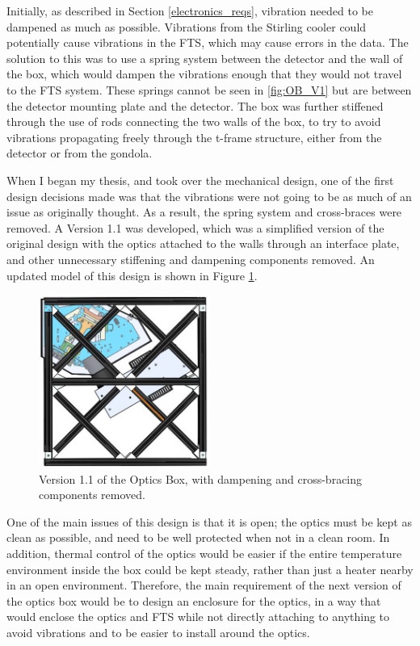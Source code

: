 Initially, as described in Section \ref{electronics_reqs}, vibration needed to be dampened as much as possible. Vibrations from the Stirling cooler could potentially cause vibrations in the FTS, which may cause errors in the data. The solution to this was to use a spring system between the detector and the wall of the box, which would dampen the vibrations enough that they would not travel to the FTS system. These springs cannot be seen in \ref{fig:OB_V1} but are between the detector mounting plate and the detector. The box was further stiffened through the use of rods connecting the two walls of the box, to try to avoid vibrations propagating freely through the t-frame structure, either from the detector or from the gondola.

When I began my thesis, and took over the mechanical design, one of the first design decisions made was that the vibrations were not going to be as much of an issue as originally thought. As a result, the spring system and cross-braces were removed. A Version 1.1 was developed, which was a simplified version of the original design with the optics attached to the walls through an interface plate, and other unnecessary stiffening and dampening components removed. An updated model of this design is shown in Figure \ref{fig:OB_V1.1}.

\begin{figure}
    \centering
    \includegraphics[width=0.5\textwidth]{chap3_images/LIFE_V1_images/Optics_Box_V0_5_front_view.JPG}
    \caption{Version 1.1 of the Optics Box, with dampening and cross-bracing components removed.}
    \label{fig:OB_V1.1}
\end{figure}

One of the main issues of this design is that it is open; the optics must be kept as clean as possible, and need to be well protected when not in a clean room. In addition, thermal control of the optics would be easier if the entire temperature environment inside the box could be kept steady, rather than just a heater nearby in an open environment. Therefore, the main requirement of the next version of the optics box would be to design an enclosure for the optics, in a way that would enclose the optics and FTS while not directly attaching to anything to avoid vibrations and to be easier to install around the optics. 

